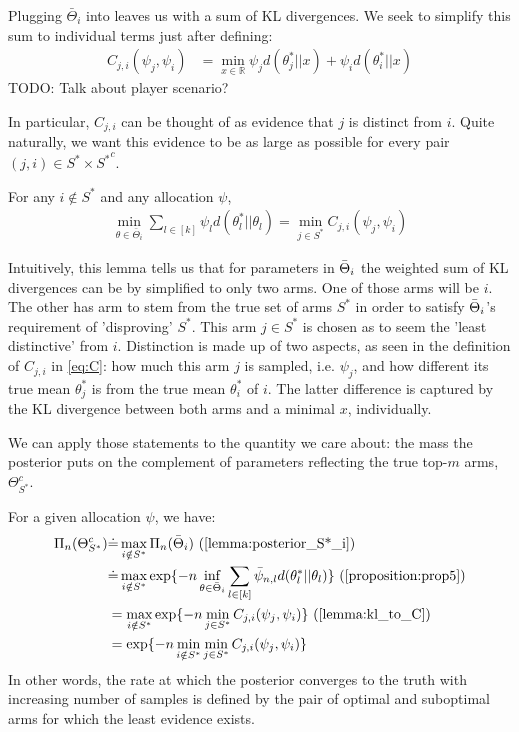 Plugging $\bar{\Theta}_i$ into  leaves us with a sum of KL divergences. We seek to simplify this sum to individual terms just after defining:
\begin{align}
  C_{j, i}(\psi_j,\psi_i) &=  \min_{x \in \mathbb{R}} \psi_j d(\theta^*_{j} || x) + \psi_i d(\theta_{i}^* ||x) \label{eq:C}
\end{align}
TODO: Talk about player scenario?

In particular, $C_{j, i}$ can be thought of as evidence that $j$ is distinct from $i$. Quite naturally, we want this evidence to be as large as possible for every pair $(j, i) \in S^* \times {S^*}^c$.

\begin{lemma}\label{lemma:kl_to_C}
  For any $i \notin S^*$ and any allocation $\psi$,
  \begin{align}
    \min_{\theta \in \bar{\Theta}_i} \sum_{l \in [k]}\psi_l d(\theta^*_l||\theta_l) = \min_{j \in S^*} C_{j, i}(\psi_j, \psi_i)
  \end{align}
\end{lemma}

Intuitively, this lemma tells us that for parameters in $\Bar{\Theta}_i$ the weighted sum of KL divergences can be by simplified to only two arms. One of those arms will be $i$. The other has arm to stem from the true set of arms $S^*$ in order to satisfy $\Bar{\Theta}_i$'s requirement of 'disproving' $S^*$. This arm $j \in S^*$ is chosen as to seem the 'least distinctive' from $i$. Distinction is made up of two aspects, as seen in the definition of $C_{j, i}$ in \eqref{eq:C}: how much this arm $j$ is sampled, i.e. $\psi_j$, and how different its true mean $\theta^*_j$ is from the true mean $\theta^*_i$ of $i$. The latter difference is captured by the KL divergence between both arms and a minimal $x$, individually.

We can apply those statements to the quantity we care about: the mass the posterior puts on the complement of parameters reflecting the true top-$m$ arms, $\Theta_{S^*}^c$.

For a given allocation $\psi$, we have:
\begin{align}
  \Pi_n(\Theta_{S^*}^c) &\deq \max_{i \notin S^*}\Pi_n(\bar{\Theta}_i) \text{ (\Cref{lemma:posterior_S*_i})}\\
    &\deq \max_{i \notin S^*} \exp\{-n\inf_{\theta \in \bar{\Theta}_i} \sum_{l \in [k]} \bar{\psi}_{n, l} d(\theta^*_l || \theta_l)\} \text{ (\Cref{proposition:prop5})} \\
    &= \max_{i \notin S^*} \exp\{-n \min_{j \in S^*} C_{j, i}(\psi_j, \psi_i)\} \text{ (\Cref{lemma:kl_to_C})} \\
    &= \exp\{-n \min_{i \notin S^*}\min_{j \in S^*} C_{j, i}(\psi_j, \psi_i)\} \label{eq:posterior}
\end{align}
In other words, the rate at which the posterior converges to the truth with increasing number of samples is defined by the pair of optimal and suboptimal arms for which the least evidence exists.

